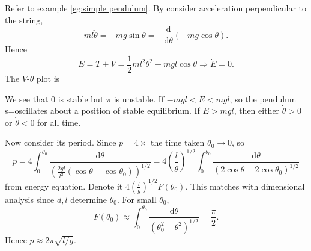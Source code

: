 \begin{example}[Pendulum]
    Refer to example \ref{eg:simple pendulum}. By consider acceleration perpendicular to the string,
    \[
        ml \ddot{\theta} = -mg \sin \theta = - \frac{\mathrm{d}}{\mathrm{d}\theta}(-mg \cos \theta) .
    \]
    Hence 
    \[
        E=T+V = \frac{1}{2}ml^2 \theta^2-mgl \cos \theta \Longrightarrow \dot{E}=0.
    \]
    The $V$-$\theta$ plot is
    \begin{center}
      \end{center} 
      We see that $ 0 $ is stable but $ \pi $ is unstable. If $ -mgl<E<mgl $, so the pendulum s=oscillates about a position of stable equilibrium. If $E>mgl$, then either $ \dot{\theta}>0 $ or $ \dot{\theta}<0 $ for all time.

      Now consider its period. Since $ p = 4\times $ the time taken $ \theta_0\to 0 $, so 
      \[
        p = 4 \int_{0}^{\theta_0} \frac{\mathrm{d}\theta}{\left( \frac{2gl}{l^2}(\cos \theta-\cos \theta_0) \right)^{1/2}} = 4 \left( \frac{l}{g} \right)^{1/2}\int_{0}^{\theta_0} \frac{\mathrm{d}\theta}{\left( 2\cos \theta-2\cos \theta_0 \right)^{1/2}}
      \]
      from energy equation. Denote it $ 4\left( \frac{l}{g} \right)^{1/2} F(\theta_0) $. This matches with dimensional analysis since $d,l$ determine $\theta_0$. For small $ \theta_0 $,
      \[
          F(\theta_0) \approx \int_{0}^{\theta_0} \frac{\mathrm{d}\theta}{(\theta_0^2-\theta^2)^{1/2}} = \frac{\pi}{2}.
      \]
      Hence $ p \approx 2\pi\sqrt{l/g} $.
\end{example}

